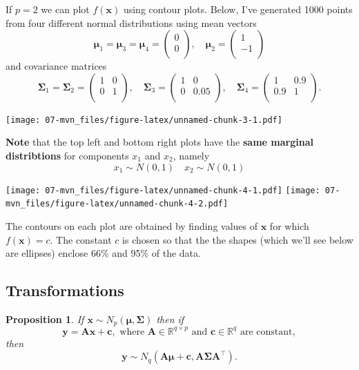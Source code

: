\documentclass[
]{book}
\newtheorem{proposition}{Proposition}[chapter]
\theoremstyle{definition}
\theoremstyle{definition}
\theoremstyle{definition}
\theoremstyle{definition}
\theoremstyle{remark}
\begin{document}
If \(p=2\) we can plot \(f(\mathbf x)\) using contour plots. Below, I've generated 1000 points from four different normal distributions using mean vectors
\[{\boldsymbol{\mu}}_1={\boldsymbol{\mu}}_3={\boldsymbol{\mu}}_4=\begin{pmatrix}0 \\0 \\\end{pmatrix}, \quad {\boldsymbol{\mu}}_2=\begin{pmatrix}1 \\-1 \\\end{pmatrix}\]
and covariance matrices
\[\boldsymbol{\Sigma}_1=\boldsymbol{\Sigma}_2=\begin{pmatrix}1&0 \\0&1 \\\end{pmatrix}, \quad \boldsymbol{\Sigma}_3=\begin{pmatrix}1&0 \\0&0.05 \\\end{pmatrix}, \quad \boldsymbol{\Sigma}_4=\begin{pmatrix}1&0.9 \\0.9&1 \\\end{pmatrix}.\]

\texttt{[image: 07-mvn\_files/figure-latex/unnamed-chunk-3-1.pdf]}

\textbf{Note} that the top left and bottom right plots have the \textbf{same marginal distribtions} for components \(x_1\) and \(x_2\), namely
\[x_1 \sim N(0, 1)\quad x_2 \sim N(0, 1)\]

\texttt{[image: 07-mvn\_files/figure-latex/unnamed-chunk-4-1.pdf]} \texttt{[image: 07-mvn\_files/figure-latex/unnamed-chunk-4-2.pdf]}

The contours on each plot are obtained by finding values of \(\mathbf x\) for which \(f(\mathbf x)=c\). The constant \(c\) is chosen so that the the shapes (which we'll see below are ellipses)
enclose 66\% and 95\% of the data.

\hypertarget{transformations}{%
\subsection{Transformations}\label{transformations}}

\begin{proposition}
\protect\hypertarget{prp:six2}{}\label{prp:six2}If \(\mathbf x\sim N_p({\boldsymbol{\mu}},\boldsymbol{\Sigma})\) then if \[\mathbf y= \mathbf A\mathbf x+ \mathbf c, \mbox{ where } \mathbf A\in \mathbb{R}^{q \times p} \mbox{ and }\mathbf c\in \mathbb{R}^q
  \mbox{ are constant},\] then
\[\mathbf y\sim N_q(\mathbf A{\boldsymbol{\mu}}+ \mathbf c, \mathbf A\boldsymbol{\Sigma}\mathbf A^\top).\]
\end{proposition}
\end{document}
